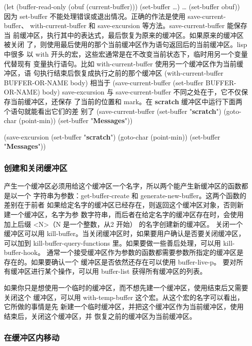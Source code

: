 \documentclass[11pt]{ctexart}
\begin{document}
{{{{(let (buffer-read-only
(obuf (current-buffer)))
(set-buffer \ldots{})
\ldots{}
(set-buffer obuf))
因为 set-buffer 不能处理错误或退出情况。正确的作法是使用 save-current-buffer、
with-current-buffer 和 save-excursion 等方法。save-current-buffer 能保存当
前缓冲区，执行其中的表达式，最后恢复为原来的缓冲区。如果原来的缓冲区被关闭
了，则使用最后使用的那个当前缓冲区作为语句返回后的当前缓冲区。lisp 中很多
以 with 开头的宏，这些宏通常是在不改变当前状态下，临时用另一个变量代替现有
变量执行语句。比如 with-current-buffer 使用另一个缓冲区作为当前缓冲区，语
句执行结束后恢复成执行之前的那个缓冲区
(with-current-buffer BUFFER-OR-NAME
body)
相当于
(save-current-buffer
(set-buffer BUFFER-OR-NAME)
body)
save-excursion 与 save-current-buffer 不同之处在于，它不仅保存当前缓冲区，还保存
了当前的位置和 mark。在 \textbf{scratch} 缓冲区中运行下面两个语句就能看出它们的差
别了
(save-current-buffer
(set-buffer "\textbf{scratch}")
(goto-char (point-min))
(set-buffer "\textbf{Messages}"))

(save-excursion
(set-buffer "\textbf{scratch}")
(goto-char (point-min))
(set-buffer "\textbf{Messages}"))
\subsubsection{创建和关闭缓冲区}
\label{sec:org0475247}
产生一个缓冲区必须用给这个缓冲区一个名字，所以两个能产生新缓冲区的函数都是以一个
字符串为参数：get-buffer-create 和 generate-new-buffer。这两个函数的差别在于前者
如果给定名字的缓冲区已经存在，则返回这个缓冲区对象，否则新建一个缓冲区，名字为参
数字符串，而后者在给定名字的缓冲区存在时，会使用加上后缀 <N>（N 是一个整数，从2
开始） 的名字创建新的缓冲区。
关闭一个缓冲区可以用 kill-buffer。当关闭缓冲区时，如果要用户确认是否要关闭缓冲区，
可以加到 kill-buffer-query-functions 里。如果要做一些善后处理，可以用
kill-buffer-hook。
通常一个接受缓冲区作为参数的函数都需要参数所指定的缓冲区是存在的。如果要确认一个
缓冲区是否依然还存在可以使用 buffer-live-p。
要对所有缓冲区进行某个操作，可以用 buffer-list 获得所有缓冲区的列表。

如果你只是想使用一个临时的缓冲区，而不想先建一个缓冲区，使用结束后又需要关闭这个
缓冲区，可以用 with-temp-buffer 这个宏。从这个宏的名字可以看出，它所做的事情是先
新建一个临时缓冲区，并把这个缓冲区作为当前缓冲区，使用结束后，关闭这个缓冲区，并
恢复之前的缓冲区为当前缓冲区。

\subsubsection{在缓冲区内移动}
\label{sec:orgf932df8}

}}}}
\end{document}
